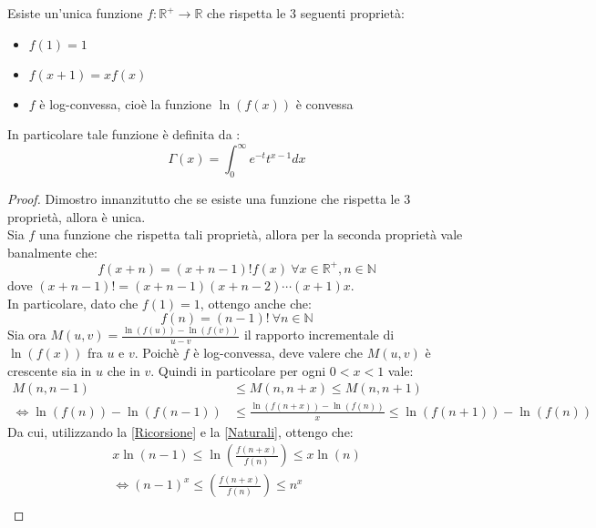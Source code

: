 \begin{theorem}
\label{BohrMollerup}
Esiste un'unica funzione $f :\mathbb{R}^{+}\rightarrow\mathbb{R} $ che rispetta le 3 seguenti proprietà:
\begin{itemize}
 \item $f(1)=1$
 \item $f(x+1)=xf(x)$
 \item $f$ è log-convessa, cioè la funzione $\ln(f(x))$ è convessa
\end{itemize}
In particolare tale funzione è definita da :
\begin{equation}
 \label{GammaDefinition}
 \Gamma(x)=\int_0^{\infty}{e^{-t}t^{x-1}dx}
\end{equation}
\end{theorem}
\begin{proof}
Dimostro innanzitutto che se esiste una funzione che rispetta le 3 proprietà, allora è unica.\\
Sia $f$ una funzione che rispetta tali proprietà, allora per la seconda proprietà vale banalmente che:
\begin{equation}
 \label{Ricorsione}
 f(x+n)=(x+n-1)!f(x)\ \forall x\in \mathbb{R}^+, n\in\mathbb{N}
\end{equation}
dove $(x+n-1)!=(x+n-1)(x+n-2)\cdots(x+1)x$.\\
In particolare, dato che $f(1)=1$, ottengo anche che:
\begin{equation}
 \label{Naturali}
 f(n)=(n-1)!\ \forall n\in \mathbb{N}
\end{equation}
Sia ora $M(u,v)=\frac{\ln(f(u))-\ln(f(v))}{u-v}$ il rapporto incrementale
di $\ln(f(x))$ fra $u$ e $v$. Poichè $f$ è log-convessa, deve valere che $M(u,v)$ è crescente sia in $u$ che in $v$.
Quindi in particolare per ogni $0<x<1$ vale:
\begin{equation*}
 \begin{split}
  M(n,n-1) & \le M(n,n+x) \le M(n,n+1) \\
  \iff \ln(f(n))-\ln(f(n-1)) & \le \frac{\ln(f(n+x))-\ln(f(n))}{x} \le \ln(f(n+1))-\ln(f(n)) 
  \end{split}
\end{equation*}
Da cui, utilizzando la \eqref{Ricorsione} e la \eqref{Naturali}, ottengo che:
\begin{gather*}
  x \ln(n-1) \le \ln \left( \frac{f(n+x)}{f(n)} \right) \le x\ln(n)\\
  \iff (n-1)^x \le \left( \frac{f(n+x)}{f(n)} \right) \le n^x \\

\end{gather*}
\end{proof}
